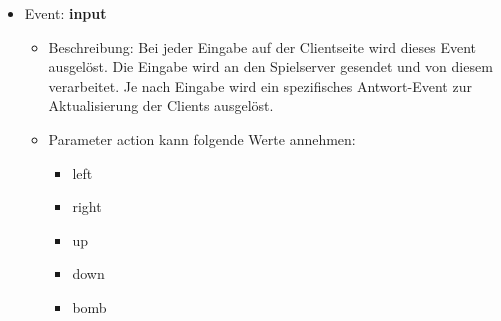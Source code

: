 \documentclass[conference]{IEEEtran}
\begin{document}
\begin{itemize}
\item Event: \textbf{input}
\begin{itemize}
\item Beschreibung:
    Bei jeder Eingabe auf der Clientseite wird dieses Event ausgelöst. Die Eingabe wird an den Spielserver gesendet und von diesem verarbeitet. Je nach Eingabe wird ein spezifisches Antwort-Event zur Aktualisierung der Clients ausgelöst.
    
\item Parameter \glqq action\grqq{} kann folgende Werte annehmen:
\begin{itemize}
    \item left
    \item right
    \item up
    \item down
    \item bomb
\end{itemize}
\end{itemize}
\end{itemize}

\smallskip
\end{document}
